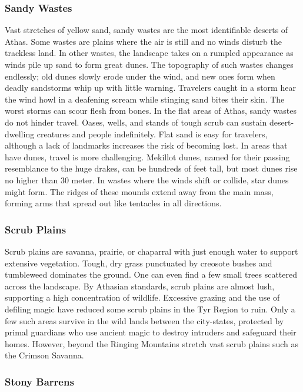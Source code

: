 \begin{multicols}{2}
\subsubsection{Sandy Wastes}

Vast stretches of yellow sand, sandy wastes are the most identifiable deserts
of Athas. Some wastes are plains where the air is still and no winds disturb
the trackless land. In other wastes, the landscape takes on a rumpled appearance
as winds pile up sand to form great dunes. The topography of such wastes
changes endlessly; old dunes slowly erode under the wind, and new ones form
when deadly sandstorms whip up with little warning. Travelers caught in a storm
hear the wind howl in a deafening scream while stinging sand bites their skin.
The worst storms can scour flesh from bones. In the flat areas of Athas, sandy
wastes do not hinder travel. Oases, wells, and stands of tough scrub can
sustain desert-dwelling creatures and people indefinitely. Flat sand is easy
for travelers, although a lack of landmarks increases the risk of becoming
lost. In areas that have dunes, travel is more challenging. Mekillot dunes,
named for their passing resemblance to the huge drakes, can be hundreds of feet
tall, but most dunes rise no higher than 30 meter. In wastes where the winds
shift or collide, star dunes might form. The ridges of these mounds extend away
from the main mass, forming arms that spread out like tentacles in all directions.

\subsubsection{Scrub Plains}

Scrub plains are savanna, prairie, or chaparral with just enough water to
support extensive vegetation. Tough, dry grass punctuated by creosote bushes
and tumbleweed dominates the ground. One can even find a few small trees
scattered across the landscape. By Athasian standards, scrub plains are almost
lush, supporting a high concentration of wildlife. Excessive grazing and the
use of defiling magic have reduced some scrub plains in the Tyr Region to ruin.
Only a few such areas survive in the wild lands between the city-states,
protected by primal guardians who use ancient magic to destroy intruders and
safeguard their homes. However, beyond the Ringing Mountains stretch vast
scrub plains such as the Crimson Savanna.

\subsubsection{Stony Barrens}


\end{multicols}
